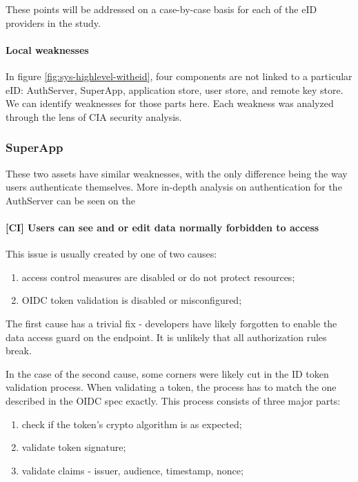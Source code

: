 These points will be addressed on a case-by-case basis for each of the eID providers in the study.

\paragraph{Local weaknesses}

In figure \ref{fig:sys-highlevel-witheid}, four components are not linked to a particular eID: AuthServer, SuperApp, application store, user store, and remote key store. We can identify weaknesses for those parts here. Each weakness was analyzed through the lens of CIA security analysis.


\subsubsection{SuperApp}

These two assets have similar weaknesses, with the only difference being the way users authenticate themselves. More in-depth analysis on authentication for the AuthServer can be seen on the

\paragraph{[CI] Users can see and or edit data normally forbidden to access} This issue is usually created by one of two causes:

\begin{enumerate}
  \item access control measures are disabled or do not protect resources;
  \item OIDC token validation is disabled or misconfigured;
\end{enumerate}

The first cause has a trivial fix - developers have likely forgotten to enable the data access guard on the endpoint. It is unlikely that all authorization rules break.

In the case of the second cause, some corners were likely cut in the ID token validation process. When validating a token, the process has to match the one described in the OIDC spec \cite{oidc} exactly. This process consists of three major parts:

\begin{enumerate}
  \item check if the token's crypto algorithm is as expected;
  \item validate token signature;
  \item validate claims - issuer, audience, timestamp, nonce;
\end{enumerate}

